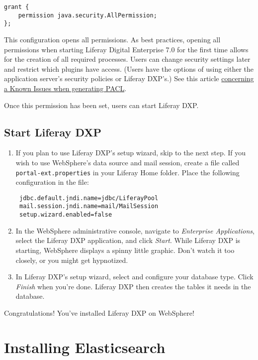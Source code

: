 \begin{verbatim}
grant {
    permission java.security.AllPermission;
};
\end{verbatim}

This configuration opens all permissions. As best practices, opening all
permissions when starting Liferay Digital Enterprise 7.0 for the first
time allows for the creation of all required processes. Users can change
security settings later and restrict which plugins have access. (Users
have the options of using either the application server's security
policies or Liferay DXP's.) See this article
\href{https://customer.liferay.com/documentation/knowledge-base/-/kb/156397}{concerning
a Known Issues when generating PACL}.

Once this permission has been set, users can start Liferay DXP.

\subsection{Start Liferay DXP}\label{start-liferay-dxp}

\begin{enumerate}
\def\labelenumi{\arabic{enumi}.}
\item
  If you plan to use Liferay DXP's setup wizard, skip to the next step.
  If you wish to use WebSphere's data source and mail session, create a
  file called \texttt{portal-ext.properties} in your Liferay Home
  folder. Place the following configuration in the file:

\begin{verbatim}
 jdbc.default.jndi.name=jdbc/LiferayPool
 mail.session.jndi.name=mail/MailSession
 setup.wizard.enabled=false
\end{verbatim}
\item
  In the WebSphere administrative console, navigate to \emph{Enterprise
  Applications}, select the Liferay DXP application, and click
  \emph{Start}. While Liferay DXP is starting, WebSphere displays a
  spinny little graphic. Don't watch it too closely, or you might get
  hypnotized.
\item
  In Liferay DXP's setup wizard, select and configure your database
  type. Click \emph{Finish} when you're done. Liferay DXP then creates
  the tables it needs in the database.
\end{enumerate}

Congratulations! You've installed Liferay DXP on WebSphere!

\section{Installing Elasticsearch}\label{installing-elasticsearch}

